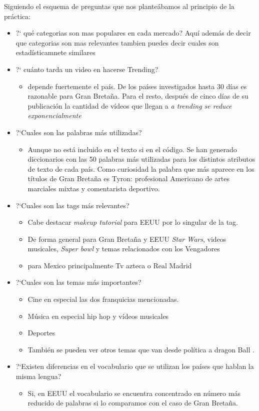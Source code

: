 \documentclass[a4paper,12pt]{article}
\begin{document}
Siguiendo el esquema de preguntas que nos plante\'abamos al principio de la pr\'actica:
\begin{itemize}

\item  ?` qu\'e categorias son mas populares en cada mercado? Aqu\'i adem\'as de decir que categorias son mas relevantes tambien puedes decir cuales son estad\'isticamnete similares

\item ?` cu\'anto tarda un video en hacerse Trending?
\begin{itemize}
\item depende fuertemente el pa\'is. De los pa\'ises investigados hasta 30 d\'ias es razonable para Gran Breta\~na. Para el resto, despu\'es de cinco d\'ias de su publicaci\'on la cantidad de v\'ideos que llegan a {\itshape a trending se reduce exponencialmente}
\end{itemize}
\item ?`Cuales son las palabras m\'as utilizadas?
\begin{itemize}
\item Aunque no est\'a incluido en el texto si en el c\'odigo. Se han generado diccionarios con las 50 palabras m\'as utilizadas para los distintos atributos de texto de cada pa\'is. Como curiosidad la palabra que m\'as aparece en los t\'itulos de Gran Breta\~na es Tyron: profesional Americano de artes marciales mixtas y comentarista deportivo.
\end{itemize}
\item ?`Cuales son las tags m\'as relevantes?
\begin{itemize}
\item Cabe destacar {\itshape makeup tutorial} para EEUU por lo singular de la tag.
\item De forma general para Gran Breta\~na y EEUU {\itshape Star Wars}, videos musicales, {\itshape Super bowl} y temas relacionados con los Vengadores
\item para Mexico principalmente Tv azteca o Real Madrid  
\end{itemize}
\item ?`Cuales son las temas m\'as importantes?
\begin{itemize}
\item Cine en especial las dos franquicias mencionadas.
\item M\'usica en especial hip hop y v\'ideos musicales
\item Deportes
\item Tambi\'en se pueden ver otros temas que van desde pol\'itica a dragon Ball .
\end{itemize}
\item ?`Existen diferencias en el vocabulario que se utilizan los pa\'ises que hablan la misma lengua?
\begin{itemize}
\item Si, en EEUU el vocabulario se encuentra concentrado en n\'umero m\'as reducido de palabras si lo comparamos con el caso de Gran Breta\~na.
\end{itemize}


\end{itemize}
\end{document}
